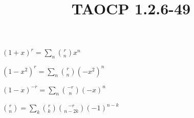 \documentclass{article}
\title{TAOCP 1.2.6\mbox{-}49}
\begin{document}
\maketitle

\( {(1+x)}^{r} = \sum_{n} \binom{r}{n}x^{n} \)

\( {(1-x^{2})}^{r} = \sum_{n} \binom{r}{n} {(-x^{2})}^{n} \)

\( {(1-x)}^{-r} = \sum_{n} \binom{-r}{n} {(-x)}^{n} \)

\( \binom{r}{n} = \sum_{k} \binom{r}{k}\binom{-r}{n-2k}{(-1)}^{n-k} \)
\end{document}
